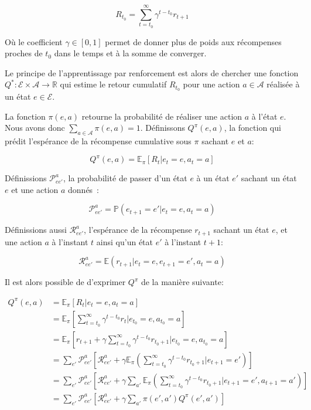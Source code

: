 \documentclass[11pt]{article}
\begin{document}
\begin{latex}
\[
R_{t_0} = \sum^\infty_{t=t_0} \gamma^{t-t_0}r_{t+1}
\]
\end{latex}

Où le coefficient \(\gamma \in [0,1]\) permet de donner plus de poids aux récompenses proches de \(t_0\) dans le temps et à la somme de converger.

Le principe de l'apprentissage par renforcement est alors de chercher une fonction \(Q^*: \mathcal{E} \times \mathcal{A} \longrightarrow \mathbb{R}\) qui estime le retour cumulatif \(R_{t_0}\) pour une action \(a \in \mathcal{A}\) réalisée à un état \(e \in \mathcal{E}\).

La fonction \(\pi(e,a)\) retourne la probabilité de réaliser une action \(a\) à l'état \(e\). Nous avons donc \(\sum_{a\in\mathcal{A}}\pi(e,a) = 1\). Définissons \(Q^\pi(e,a)\), la fonction qui prédit l'espérance de la récompense cumulative sous \(\pi\) sachant \(e\) et \(a\):


\begin{equation}
\label{eqn:q_value}
  Q^\pi(e, a) = \mathbb{E}_\pi[R_t|e_t=e,a_t=a]
\end{equation}

Définissions \(\mathcal{P}^a_{ee'}\), la probabilité de passer d'un état \(e\) à un état \(e'\) sachant un état \(e\) et une action \(a\) donnés :

\begin{latex}
\[
\mathcal{P}^a_{ee'} = \mathbb{P}(e_{t+1}=e'|e_t=e, a_t=a)
\]
\end{latex}

Définissions aussi \(\mathcal{R}^a_{ee'}\), l'espérance de la récompense \(r_{t+1}\)
sachant un état \(e\), et une action \(a\) à l'instant \(t\) ainsi qu'un état \(e'\) à
l'instant \(t+1\):

\begin{latex}
\[
\mathcal{R}^a_{ee'} = \mathbb{E}(r_{t+1}|e_t=e, e_{t+1}=e', a_t=a)
\]
\end{latex}

Il est alors possible de d'exprimer \(Q^\pi\) de la manière suivante:

\begin{latex}
\begin{align}
Q^\pi(e, a) &= \mathbb{E}_\pi[R_t|e_t=e,a_t=a] \\
&= \mathbb{E}_\pi[\sum_{t=t_0}^\infty \gamma^{t-t_0}r_t|e_{t_0}=e,a_{t_0}=a] \\
&= \mathbb{E}_\pi[r_{t+1}+\gamma\sum_{t=t_0}^\infty \gamma^{t-t_0}r_{t_0+1}|e_{t_0}=e,a_{t_0}=a] \\
&= \sum_{e'}\mathcal{P}^a_{ee'}\left[ \mathcal{R}^a_{ee'} +
  \gamma\mathbb{E}_\pi \left( \sum^\infty_{t=t_0}\gamma^{t-t_0}r_{t_0+1}|e_{t+1}=e' \right) \right] \\
&= \sum_{e'}\mathcal{P}^a_{ee'}\left[ \mathcal{R}^a_{ee'} +
  \gamma\sum_{a'}\mathbb{E}_\pi \left(
    \sum^\infty_{t=t_0}\gamma^{t-t_0}r_{t_0+1}|e_{t+1}=e', a_{t+1}=a' \right) \right] \\
&= \sum_{e'}\mathcal{P}^a_{ee'}\left[ \mathcal{R}^a_{ee'} +
  \gamma\sum_{a'} \pi(e',a')Q^\pi(e', a') \right]
\end{align}
\end{latex}
\end{document}

